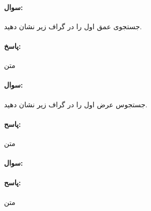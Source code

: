 \documentclass[a4paper,10pt]{article}
\begin{document}
    \noindent\hrulefill

    \paragraph{سوال:} جستجوی عمق اول را در گراف زیر نشان دهید.

    \paragraph{پاسخ:} متن

    \noindent\hrulefill

    \paragraph{سوال:} جستجوس عرض اول را در گراف زیر نشان دهید.

    \paragraph{پاسح:} متن

    \noindent\hrulefill

    \paragraph{سوال:} 

    \paragraph{پاسح:} متن
\end{document}
